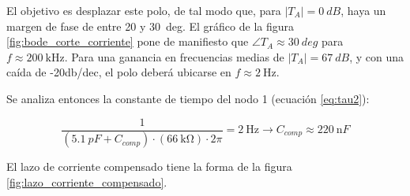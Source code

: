 \documentclass[]{article}
\begin{document}
	El objetivo es desplazar este polo, de tal modo que, para $|T_A| = \SI{0}{dB}$, haya un margen de fase de entre \SI{20}{\deg} y \SI{30}{deg}. El gráfico de la figura \ref{fig:bode_corte_corriente} pone de manifiesto que $\angle T_A \approx \SI{30}{deg}$ para $f \approx \SI{200}{\kilo\hertz}$. Para una ganancia en frecuencias medias de $|T_A| = \SI{67}{dB}$, y con una caída de -20db/dec, el polo deberá ubicarse en $f \approx \SI{2}{\hertz}$.
	
	Se analiza entonces la constante de tiempo del nodo 1 (ecuación \ref{eq:tau2}):
	
	\begin{equation}
		\frac{1}{(\SI{5.1}{pF} + C_{comp}) \cdot (\SI{66}{\kilo\ohm}) \cdot 2\pi} = \SI{2}{\hertz} \to C_{comp} \approx \SI{220}{\nano F}
	\end{equation}
	
	El lazo de corriente compensado tiene la forma de la figura \ref{fig:lazo_corriente_compensado}. 
	
\end{document}
